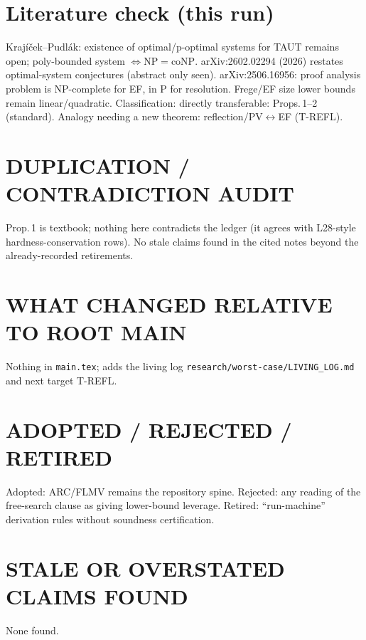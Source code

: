 \documentclass{article}
\begin{document}
\section*{Literature check (this run)}
Krajíček--Pudlák: existence of optimal/p-optimal systems for TAUT remains open; poly-bounded system $\iff \mathrm{NP}=\mathrm{coNP}$. arXiv:2602.02294 (2026) restates optimal-system conjectures (abstract only seen). arXiv:2506.16956: proof analysis problem is NP-complete for EF, in P for resolution. Frege/EF size lower bounds remain linear/quadratic. Classification: directly transferable: Props.\,1--2 (standard). Analogy needing a new theorem: reflection/PV$\leftrightarrow$EF (T-REFL).

\section*{DUPLICATION / CONTRADICTION AUDIT}
Prop.\,1 is textbook; nothing here contradicts the ledger (it agrees with L28-style hardness-conservation rows). No stale claims found in the cited notes beyond the already-recorded retirements.
\section*{WHAT CHANGED RELATIVE TO ROOT MAIN}
Nothing in \texttt{main.tex}; adds the living log \texttt{research/worst-case/LIVING\_LOG.md} and next target T-REFL.
\section*{ADOPTED / REJECTED / RETIRED}
Adopted: ARC/FLMV remains the repository spine. Rejected: any reading of the free-search clause as giving lower-bound leverage. Retired: ``run-machine'' derivation rules without soundness certification.
\section*{STALE OR OVERSTATED CLAIMS FOUND}
None found.
\end{document}
